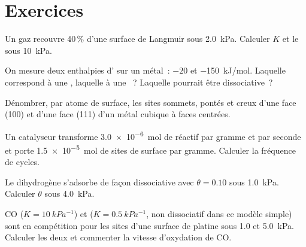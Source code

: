 \section{Exercices}

\begin{exercise}[$\star$]\label{exo:b3:surfaces-catalysis:1}
Un gaz recouvre 40\,\% d'une surface de Langmuir sous \qty{2.0}{kPa}.
Calculer $K$ et le  sous
\qty{10}{kPa}.
\end{exercise}

\begin{exercise}[$\star$]\label{exo:b3:surfaces-catalysis:2}
On mesure deux enthalpies d' sur un métal~: $-20$ et
\qty{-150}{kJ/mol}. Laquelle correspond à une , laquelle à
une ~? Laquelle pourrait être dissociative~?
\end{exercise}

\begin{exercise}[$\star$]\label{exo:b3:surfaces-catalysis:3}
Dénombrer, par atome de surface, les sites sommets, pontés et creux d'une
face (100) et d'une face (111) d'un métal cubique à faces centrées.
\end{exercise}

\begin{exercise}[$\star$]\label{exo:b3:surfaces-catalysis:4}
Un catalyseur transforme \qty{3.0e-6}{mol} de réactif par gramme et par
seconde et porte
\qty{1.5e-5}{mol} de sites de surface par gramme. Calculer la fréquence
de cycles.
\end{exercise}

\begin{exercise}[$\star\star$]\label{exo:b3:surfaces-catalysis:5}
Le dihydrogène s'adsorbe de façon dissociative avec $\theta = 0.10$ sous \qty{1.0}{kPa}. Calculer $\theta$ sous \qty{4.0}{kPa}.
\end{exercise}

\begin{exercise}[$\star\star$]\label{exo:b3:surfaces-catalysis:6}
CO ($K = \qty{10}{kPa^{-1}}$) et  ($K = \qty{0.5}{kPa^{-1}}$, non
dissociatif dans ce modèle simple) sont en compétition pour les sites
d'une surface de platine sous 1.0 et \qty{5.0}{kPa}. Calculer les deux
 et commenter la vitesse d'oxydation de CO.
\end{exercise}


